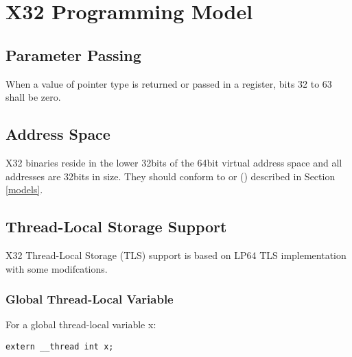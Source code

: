 \chapter{X32 Programming Model\label{x32}}

\section{Parameter Passing}
When a value of pointer type is returned or passed in a register, bits 32
to 63 shall be zero.

\section{Address Space}

\xARCH X32 binaries reside in the lower 32bits of the 64bit virtual
address space and all addresses are 32bits in size.  They should conform
to  or
 ()
described in Section \ref{models}.

\section{Thread-Local Storage Support}

X32 Thread-Local Storage (TLS) support is based on LP64 TLS
implementation with some modifcations.

\subsection{Global Thread-Local Variable}

For a global thread-local variable x:

\begin{verbatim}
extern __thread int x;
\end{verbatim}

